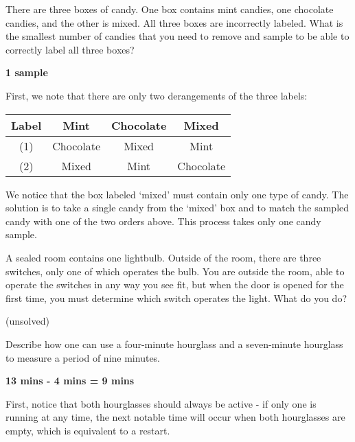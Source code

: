 \documentclass[answers]{exam}
\begin{document}

\begin{questions}
\question %

There are three boxes of candy. One box contains mint candies, one chocolate candies, and the other is mixed. All three boxes are incorrectly labeled. What is the smallest number of candies that you need to remove and sample to be able to correctly label all three boxes?

\begin{solution} 
\textbf{1 sample}

	First, we note that there are only two derangements of the three labels:
	
	\begin{center}
		\begin{tabular}{c | c | c | c }
			Label & Mint & Chocolate & Mixed \\
			\hline
			(1) & Chocolate & Mixed & Mint \\
			(2) & Mixed & Mint & Chocolate \\
		\end{tabular}
	\end{center}
	
	We notice that the box labeled `mixed' must contain only one type of candy. The solution is to take a single candy from the `mixed' box and to match the sampled candy with one of the two orders above. This process takes only one candy sample.
\end{solution}

\question %
A sealed room contains one lightbulb. Outside of the room, there are three switches, only one of which operates the bulb. You are outside the room, able to operate the switches in any way you see fit, but when the door is opened for the first time, you must determine which switch operates the light. What do you do?

\begin{solution}
(unsolved)
\end{solution}

\question %
Describe how one can use a four-minute hourglass and a seven-minute hourglass to measure a period of nine minutes.

\begin{solution}
\textbf{13 mins - 4 mins = 9 mins}

First, notice that both hourglasses should always be active - if only one is running at any time, the next notable time will occur when both hourglasses are empty, which is equivalent to a restart.


\end{solution}
\end{questions}
\end{document}
